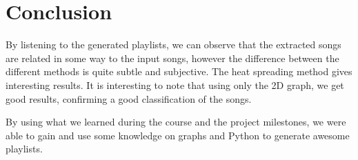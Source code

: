 \documentclass[11pt,a4paper,twoside]{article}
\begin{document}
\section{Conclusion}
By listening to the generated playlists, we can observe that the extracted songs are related in some way to the input songs, however the difference between the different methods is quite subtle and subjective. The heat spreading method gives interesting results. 
It is interesting to note that using only the 2D graph, we get good results, confirming a good classification of the songs. 

By using what we learned during the course and the project milestones, we were able to gain and use some knowledge on graphs and Python to generate awesome playlists.

{}

\end{document}
